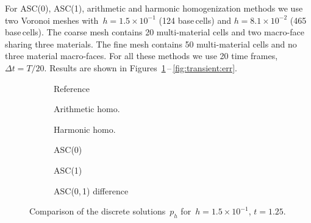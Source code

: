 	  For ASC(0), ASC(1), arithmetic and harmonic homogenization methods we use two Voronoi meshes with~$h = 1.5 \times 10^{-1}$ (124 base\,cells) and $h = 8.1 \times 10^{-2}$ (465 base\,cells).
          The coarse mesh contains 20 multi-material cells and two macro-face sharing three materials. The fine mesh contains 50 multi-material cells and no three material macro-faces. For all these methods we use 20 time frames, $\Delta t = T / 20$. Results are shown in Figures~\ref{fig:transient:comp}\,--\,\ref{fig:transient:err}.
	
	\begin{figure}[h]
		\centering
		\begin{subfigure}{.3\linewidth}
			\centering
			\caption{Reference}
		\end{subfigure}%
		\hfill
		\begin{subfigure}{.3\linewidth}
			\centering
			\caption{Arithmetic homo.}	
		\end{subfigure}%
		\hfill
		\begin{subfigure}{.3\linewidth}
			\centering
			\caption{Harmonic homo.}	
		\end{subfigure}%
		\par
		\begin{subfigure}{.3\linewidth}
			\centering
			\caption{ASC(0)}
		\end{subfigure}%
		\hfill
		\begin{subfigure}{.3\linewidth}
			\centering
			\caption{ASC(1)}	
		\end{subfigure}%
		\hfill
		\begin{subfigure}{.3\linewidth}
			\centering
			\caption{ASC(0,\,1) difference}	
		\end{subfigure}%
\caption{Comparison of the discrete solutions~$p_h$ for~$h = 1.5 \times 10^{-1}$, $t = 1.25$. \label{fig:transient:comp}}
	\end{figure}

